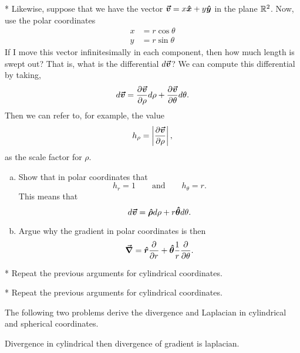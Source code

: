 \documentclass[12pt]{article} %
\begin{document}
\vspace*{1cm}
\begin{problem} *
    Likewise, suppose that we have the vector $\boldsymbol{\boldsymbol{\vec{v}}} = x\boldsymbol{\hat{x}} + y\boldsymbol{\hat{y}}$ in the plane $\mathbb{R}^2$.  Now, use the polar coordinates
    \begin{align*}
    x &= r \cos \theta\\
    y &= r \sin \theta
    \end{align*}
    If I move this vector infinitesimally in each component, then how much length is swept out? That is, what is the differential $d\boldsymbol{\boldsymbol{\vec{v}}}$? We can compute this differential by taking,
    \[
    d\boldsymbol{\boldsymbol{\vec{v}}} = \frac{\partial \boldsymbol{\boldsymbol{\vec{v}}}}{\partial \rho}d\rho+\frac{\partial \boldsymbol{\boldsymbol{\vec{v}}}}{\partial \theta}d\theta.
    \]
    Then we can refer to, for example, the value
        \[
        h_\rho = \left| \frac{\partial \boldsymbol{\boldsymbol{\vec{v}}}}{\partial \rho} \right|,
        \]
        as the scale factor for $\rho$.
    \begin{enumerate}[(a)]
        \item Show that in polar coordinates that
        \[
        h_r = 1 \qquad \textrm{and} \qquad h_\theta = r.
        \]
        This means that
        \[
        d\boldsymbol{\boldsymbol{\vec{v}}} =  \boldsymbol{\boldsymbol{\hat{\rho}}} d\rho + r\boldsymbol{\boldsymbol{\hat{\theta}}} d\theta.
        \]
        \item Argue why the gradient in polar coordinates is then
        \[
        \boldsymbol{\vec{\nabla}} = \boldsymbol{\boldsymbol{\hat{r}}} \frac{\partial}{\partial r} + \boldsymbol{\boldsymbol{\hat{\theta}}} \frac{1}{r}\frac{\partial}{\partial \theta}.
        \]
    \end{enumerate}
\end{problem}

\vspace*{1cm}
\begin{problem}
    * Repeat the previous arguments for cylindrical coordinates.
\end{problem}

\vspace*{1cm}
\begin{problem}
    * Repeat the previous arguments for cylindrical coordinates.
\end{problem}

\vspace*{1cm}
\begin{centering} The following two problems derive the divergence and Laplacian in cylindrical and spherical coordinates.
\end{centering}

\vspace*{1cm}
\begin{problem}
    Divergence in cylindrical then divergence of gradient is laplacian.
\end{problem}
\end{document}
